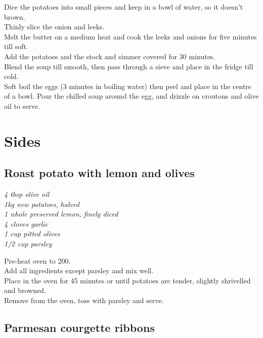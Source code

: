\documentclass{tufte-book}
\begin{document}
\smallskip
Dice the potatoes into small pieces and keep in a bowl of water, so it doesn't brown.
\\Thinly slice the onion and leeks. 
\\Melt the butter on a medium heat and cook the leeks and onions for five minutes till soft.
\\Add the potatoes and the stock and simmer covered for 30 minutes.
\\Blend the soup till smooth, then pass through a sieve and place in the fridge till cold.
\\Soft boil the eggs (3 minutes in boiling water) then peel and place in the centre of a bowl. Pour the chilled soup around the egg, and drizzle on croutons and olive oil to serve.


\chapter{Sides}
\section{Roast potato with lemon and olives}

\smallskip
\emph{4 tbsp olive oil
\\1kg new potatoes, halved
\\1 whole preserved lemon, finely diced
\\4 cloves garlic
\\1 cup pitted olives
\\1/2 cup parsley
}
\smallskip

Pre-heat oven to 200\celsius.
\\Add all ingredients except parsley and mix well.
\\Place in the oven for 45 minutes or until potatoes are tender, slightly shrivelled and browned. 
\\Remove from the oven, toss with parsley and serve.


\section{Parmesan courgette ribbons}
\end{document}
